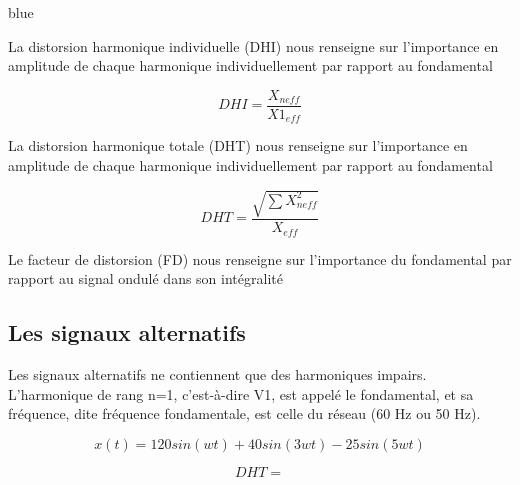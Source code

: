 \begin{items}{blue}{\Triangle}
    \item La distorsion harmonique individuelle (DHI) nous renseigne sur l’importance en amplitude de chaque harmonique individuellement par rapport au fondamental

    $$ DHI = \frac{X_{neff}}{X1_{eff}}$$
    \item La distorsion harmonique totale (DHT) nous renseigne sur l’importance en amplitude de chaque harmonique individuellement par rapport au fondamental

    $$ DHT = \frac{\sqrt{ \sum X_{neff}^2}}{X_{eff}}$$
    \item Le facteur de distorsion (FD) nous renseigne sur l’importance du fondamental par rapport au signal ondulé dans son intégralité
\end{items}

\subsection{Les signaux alternatifs}

Les signaux alternatifs ne contiennent que des harmoniques impairs. L’harmonique de
rang n=1, c’est-à-dire V1, est appelé le fondamental, et sa fréquence, dite fréquence
fondamentale, est celle du réseau (60 Hz ou 50 Hz).


$$ x(t) = 120 sin(wt)+40sin(3wt)-25sin(5wt) $$



$$ DHT = $$